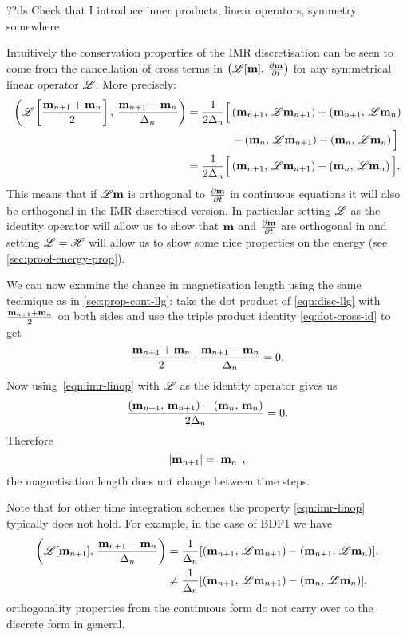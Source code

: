 ??ds Check that I introduce inner products, linear operators, symmetry somewhere

Intuitively the conservation properties of the IMR discretisation can be seen to come from the cancellation of cross terms in $\left(\mathscr{L}[\boldsymbol{\mathrm{m}}],\, \frac{\partial \boldsymbol{\mathrm{m}}}{\partial t} \right)$ for any symmetrical linear operator $\mathscr{L}$.
More precisely:
\begin{equation}
  \begin{aligned}
    \label{eqn:imr-linop}
    \ip{\lop \left[ \frac{\mv_{n+1} + \mv_n}{2} \right]}{ \frac{\mv_{n+1} - \mv_n}{\dtn} }
    &= \frac{1}{2\dtn} \Big[
    \ip{\mv_{n+1}}{\lop \mv_{n+1}} + \ip{\mv_{n+1}}{\lop \mv_{n}} \\
    & \qquad\qquad - \ip{\mv_{n}}{\lop \mv_{n+1}} - \ip{\mv_{n}}{\lop \mv_{n}}
    \Big] \\
    &= \frac{1}{2\dtn} \Big[
    \ip{\mv_{n+1}}{\lop \mv_{n+1}}
    - \ip{\mv_{n}}{\lop \mv_{n}}
    \Big].
  \end{aligned}
\end{equation}
This means that if $\mathscr{L} \boldsymbol{\mathrm{m}}$ is orthogonal to $\frac{\partial \boldsymbol{\mathrm{m}}}{\partial t}$ in continuous equations it will also be orthogonal in the IMR discretised version.
In particular setting $\mathscr{L}$ as the identity operator will allow us to show that $\boldsymbol{\mathrm{m}}$ and $\frac{\partial \boldsymbol{\mathrm{m}}}{\partial t}$ are orthogonal in  and setting $\mathscr{L} = \mathscr{H}$ will allow us to show some nice properties on the energy (see \cref{sec:proof-energy-prop}).

We can now examine the change in magnetisation length using the same technique as in \cref{sec:prop-cont-llg}: take the dot product of \cref{eqn:disc-llg} with $\frac{\boldsymbol{\mathrm{m}}_{n+1} + \boldsymbol{\mathrm{m}}_n}{2}$ on both sides and use the triple product identity \cref{eq:dot-cross-id} to get
\begin{equation}
  \label{eq:63}
  \frac{\mv_{n+1} + \mv_n}{2} \cdot \frac{\mv_{n+1} - \mv_n}{\dtn} = 0.
\end{equation}
Now using~\cref{eqn:imr-linop} with $\mathscr{L}$ as the identity operator gives us
\begin{equation}
  \frac{\left(\boldsymbol{\mathrm{m}}_{n+1},\, \boldsymbol{\mathrm{m}}_{n+1} \right) - \left(\boldsymbol{\mathrm{m}}_n,\, \boldsymbol{\mathrm{m}}_n \right) }{2 \Delta_{n}} = 0.
\end{equation}
Therefore
\begin{equation}
  \left|{\boldsymbol{\mathrm{m}}_{n+1}} \right| = \left|{\boldsymbol{\mathrm{m}}_n} \right|,
\end{equation}
\ie the magnetisation length does not change between time steps.

Note that for other time integration schemes the property \cref{eqn:imr-linop} typically does not hold.
For example, in the case of BDF1 we have
\begin{equation}
  \begin{aligned}
    \left(\mathscr{L} {\left[ \boldsymbol{\mathrm{m}}_{n+1} \right]},\,  \frac{\boldsymbol{\mathrm{m}}_{n+1} - \boldsymbol{\mathrm{m}}_n}{\Delta_{n}}  \right)
    &= \frac{1}{\Delta_{n}} {\left[  \left(\boldsymbol{\mathrm{m}}_{n+1},\, \mathscr{L} \boldsymbol{\mathrm{m}}_{n+1} \right)
      - \left(\boldsymbol{\mathrm{m}}_{n+1},\, \mathscr{L} \boldsymbol{\mathrm{m}}_n \right)  \right]}, \\
    &\neq \frac{1}{\Delta_{n}} {\left[  \left(\boldsymbol{\mathrm{m}}_{n+1},\, \mathscr{L} \boldsymbol{\mathrm{m}}_{n+1} \right)
      - \left(\boldsymbol{\mathrm{m}}_n,\, \mathscr{L} \boldsymbol{\mathrm{m}}_n \right)  \right]},
  \end{aligned}
\end{equation}
\ie orthogonality properties from the continuous form do not carry over to the discrete form in general.

